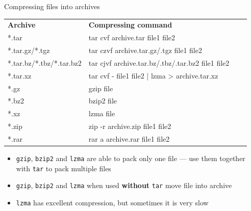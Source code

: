 \documentclass[hyperref={bookmarks=true, unicode=true, colorlinks=true, pdftitle={Linux, command line and MetaCentrum}, plainpages=false, pdfauthor={Vojtech Zeisek}, pdfsubject={Course about use of Linux command line, writing shell scripts and using MetaCentrum of CESNET}, pdfcreator={XeLaTeX, http://www.xelatex.org/}, pdfkeywords={Linux, GNU, BASH, shell, command line, MetaCentrum}, linkcolor=Sienna, anchorcolor=black, citecolor=green, filecolor=magenta, menucolor=Sienna, urlcolor=cyan, pdftex}, compress, ucs, xelatex, xcolor=svgnames, 11pt]{beamer}
\begin{document}
\begin{frame}{Compressing files into archives}
\begin{center}
\begin{tabular}{llll}
\textbf{Archive} & \textbf{Compressing command}\\
*.tar & tar cvf archive.tar file1 file2\\
*.tar.gz\alert{/}*.tgz & tar czvf archive.tar.gz\alert{/}.tgz file1 file2\\
*.tar.bz\alert{/}*.tbz\alert{/}*.tar.bz2 & tar cjvf archive.tar.bz\alert{/}.tbz\alert{/}.tar.bz2 file1 file2\\
*.tar.xz & tar cvf - file1 file2 | lzma > archive.tar.xz\\
*.gz & gzip file\\
*.bz2 & bzip2 file\\
*.xz & lzma file\\
*.zip & zip -r archive.zip file1 file2\\
*.rar & rar a archive.rar file1 file2\\
\end{tabular}
\end{center}
\begin{itemize}
  \item \texttt{gzip}, \texttt{bzip2} and \texttt{lzma} are able to pack only one file --- use them together with \texttt{tar} to pack multiple files
  \item \texttt{gzip}, \texttt{bzip2} and \texttt{lzma} when used \textbf{without} \texttt{tar} \alert{move} file into archive
  \item \texttt{lzma} has excellent compression, but sometimes it is very slow
\end{itemize}
\end{frame}
\end{document}
